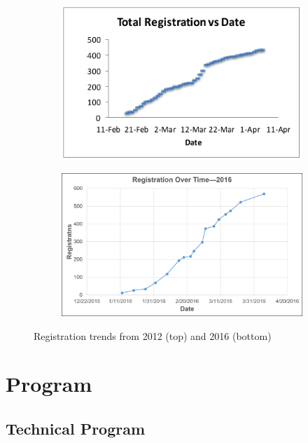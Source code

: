 \documentclass[12pt]{article}
\begin{document}
\begin{figure}[h!]
    \centering
    \begin{subfigure}[b]{0.75\textwidth}
        \includegraphics[width=\textwidth]{Reg2012.PNG}
    \end{subfigure}
    
    \begin{subfigure}[b]{0.75\textwidth}
        \includegraphics[width=\textwidth]{Reg2016.png}
    \end{subfigure}
    
    \caption{Registration trends from 2012 (top) and 2016 (bottom)}
    \label{fig:Reg}
\end{figure}



\clearpage
\section{Program}

\subsection{Technical Program}
\end{document}
